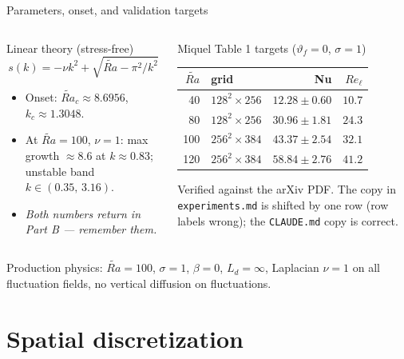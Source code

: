 \documentclass[aspectratio=169,10pt]{beamer}
\newcommand{\Rat}{\widetilde{Ra}}
\newcommand{\Ld}{L_d}
\newcommand{\file}[1]{\textcolor{blue!60!black}{\texttt{#1}}}
\begin{document}
\begin{frame}{Parameters, onset, and validation targets}
  \begin{columns}[T]
    \begin{block}{Linear theory (stress-free)}
      \[
        s(k) = -\nu k^2 + \sqrt{\Rat - \pi^2/k^2}
      \]
      \begin{itemize}
        \item Onset: $\Rat_c \approx 8.6956$, $k_c \approx 1.3048$.
        \item At $\Rat=100$, $\nu=1$: max growth $\approx 8.6$ at $k\approx0.83$;
          unstable band $k \in (0.35,\, 3.16)$.
        \item \emph{Both numbers return in Part B --- remember them.}
      \end{itemize}
    \end{block}
    \begin{block}{Miquel Table 1 targets ($\vartheta_f=0$, $\sigma=1$)}
      \footnotesize
      \begin{tabular}{@{}rlrr@{}}
        \toprule
        $\Rat$ & grid & Nu & $Re_\ell$ \\
        \midrule
        40  & $128^2{\times}256$ & $12.28\pm0.60$ & $10.7$ \\
        80  & $128^2{\times}256$ & $30.96\pm1.81$ & $24.3$ \\
        100 & $256^2{\times}384$ & $\mathbf{43.37\pm2.54}$ & $32.1$ \\
        120 & $256^2{\times}384$ & $58.84\pm2.76$ & $41.2$ \\
        \bottomrule
      \end{tabular}
      \par\medskip
      \scriptsize Verified against the arXiv PDF. The copy in
      \file{experiments.md} is shifted by one row (row labels wrong); the
      \file{CLAUDE.md} copy is correct.
    \end{block}
  \end{columns}
  \medskip
  Production physics: $\Rat=100$, $\sigma=1$, $\beta=0$, $\Ld=\infty$,
  Laplacian $\nu=1$ on all fluctuation fields, no vertical diffusion on fluctuations.
\end{frame}

\section{Spatial discretization}
\end{document}

